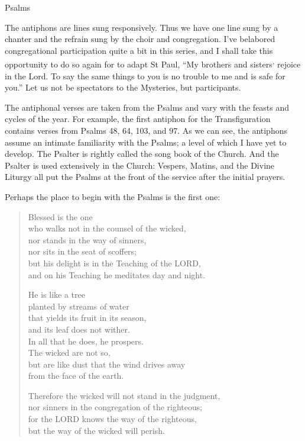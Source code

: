\documentclass[
]{article}
\begin{document}
Psalms

The antiphons are lines sung responsively. Thus we have one line sung by
a chanter and the refrain sung by the choir and congregation. I've
belabored congregational participation quite a bit in this series, and I
shall take this opportunity to do so again for to adapt St Paul, ``My
brothers and sisters\emph{\textsuperscript{,}} rejoice in the Lord. To
say the same things to you is no trouble to me and is safe for you.''
Let us not be spectators to the Mysteries, but participants.

The antiphonal verses are taken from the Psalms and vary with the feasts
and cycles of the year. For example, the first antiphon for the
Transfiguration contains verses from Psalms 48, 64, 103, and 97. As we
can see, the antiphons assume an intimate familiarity with the Psalms; a
level of which I have yet to develop. The Psalter is rightly called the
song book of the Church. And the Psalter is used extensively in the
Church: Vespers, Matins, and the Divine Liturgy all put the Psalms at
the front of the service after the initial prayers.

Perhaps the place to begin with the Psalms is the first one:

\begin{quote}
Blessed is the one\\
who walks not in the counsel of the wicked,\\
nor stands in the way of sinners,\\
nor sits in the seat of scoffers;\\
but his delight is in the Teaching of the LORD,\\
and on his Teaching he meditates day and night.

He is like a tree\\
planted by streams of water\\
that yields its fruit in its season,\\
and its leaf does not wither.\\
In all that he does, he prospers.\\
The wicked are not so,\\
but are like dust that the wind drives away\\
from the face of the earth.

Therefore the wicked will not stand in the judgment,\\
nor sinners in the congregation of the righteous;\\
for the LORD knows the way of the righteous,\\
but the way of the wicked will perish.
\end{quote}
\end{document}
